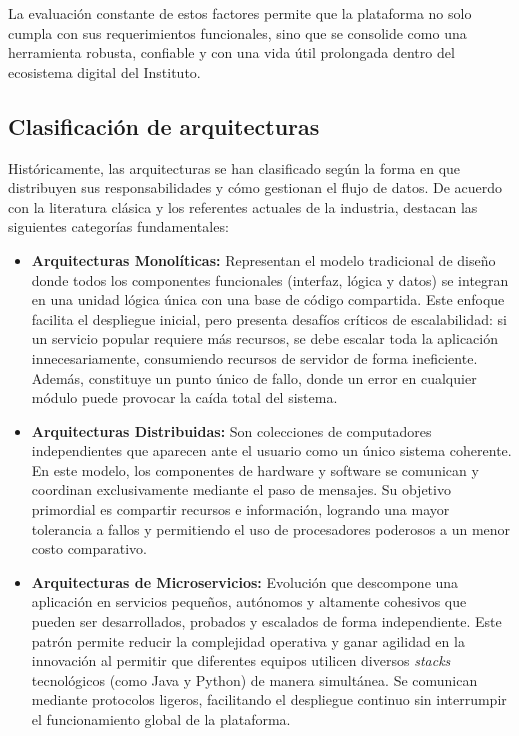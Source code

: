 La evaluación constante de estos factores permite que la plataforma no solo cumpla con sus requerimientos funcionales, sino que se consolide como una herramienta robusta, confiable y con una vida útil prolongada dentro del ecosistema digital del Instituto.

\subsection{Clasificación de arquitecturas}

Históricamente, las arquitecturas se han clasificado según la forma en que distribuyen sus responsabilidades y cómo gestionan el flujo de datos. De acuerdo con la literatura clásica y los referentes actuales de la industria, destacan las siguientes categorías fundamentales:

\begin{itemize}
    \item \textbf{Arquitecturas Monolíticas:} Representan el modelo tradicional de diseño donde todos los componentes funcionales (interfaz, lógica y datos) se integran en una unidad lógica única con una base de código compartida. Este enfoque facilita el despliegue inicial, pero presenta desafíos críticos de escalabilidad: si un servicio popular requiere más recursos, se debe escalar toda la aplicación innecesariamente, consumiendo recursos de servidor de forma ineficiente. Además, constituye un punto único de fallo, donde un error en cualquier módulo puede provocar la caída total del sistema.

    \item \textbf{Arquitecturas Distribuidas:} Son colecciones de computadores independientes que aparecen ante el usuario como un único sistema coherente. En este modelo, los componentes de hardware y software se comunican y coordinan exclusivamente mediante el paso de mensajes. Su objetivo primordial es compartir recursos e información, logrando una mayor tolerancia a fallos y permitiendo el uso de procesadores poderosos a un menor costo comparativo.

    \item \textbf{Arquitecturas de Microservicios:} Evolución que descompone una aplicación en servicios pequeños, autónomos y altamente cohesivos que pueden ser desarrollados, probados y escalados de forma independiente. Este patrón permite reducir la complejidad operativa y ganar agilidad en la innovación al permitir que diferentes equipos utilicen diversos \textit{stacks} tecnológicos (como Java y Python) de manera simultánea. Se comunican mediante protocolos ligeros, facilitando el despliegue continuo sin interrumpir el funcionamiento global de la plataforma.


\end{itemize}

